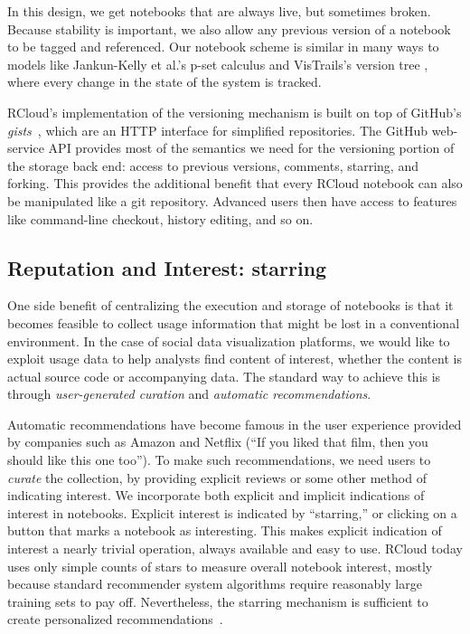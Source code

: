 In this design, we get notebooks that are always live,
but sometimes broken. Because stability is important, we also
allow any previous version of a notebook to be tagged and referenced.
Our notebook scheme is similar in many ways to models like
Jankun-Kelly et al.'s p-set calculus
\cite{Jankun-Kelly:2007:MFV} and VisTrails's version tree
\cite{Callahan:2006:VVM}, where every change in the state of the
system is tracked.

RCloud's implementation of the versioning mechanism is built on
top of GitHub's \emph{gists}~\cite{GitHub:2014:GG}, which are an HTTP
interface for simplified repositories. The GitHub web-service API
provides most of the semantics we need for the versioning portion of
the storage back end: access to previous versions, comments, starring,
and forking. This provides the additional benefit that every RCloud
notebook can also be manipulated like a git repository. Advanced users
then have access to features like command-line checkout, history
editing, and so on.

\subsection{Reputation and Interest: starring\label{sec:starring}}

One side benefit of centralizing the execution and storage of
notebooks is that it becomes feasible to collect usage information
that might be lost in a conventional environment.
In the case of social data visualization
platforms, we would like to exploit usage data to help analysts
find content of interest, whether the content is actual source code
or accompanying data. The standard way to achieve this is through
\emph{user-generated curation} and \emph{automatic recommendations}.

Automatic recommendations have become famous in the user experience
provided by companies such as Amazon and Netflix (``If you liked
that film, then you should like this one too''). To make such
recommendations, we need users to \emph{curate} the collection, by
providing explicit reviews or some other method of indicating interest.
We incorporate both explicit and implicit indications of interest
in notebooks. Explicit interest is indicated by ``starring,'' or
clicking on a button that marks a notebook as interesting.
This makes explicit indication of interest a nearly trivial operation,
always available and easy to use.
%
RCloud today uses only simple counts of stars to measure overall
notebook interest, mostly because standard
recommender system algorithms 
require reasonably large training sets to pay off.
Nevertheless, the starring mechanism is sufficient
to create personalized recommendations~\cite{Hu:2008:CFF}.

